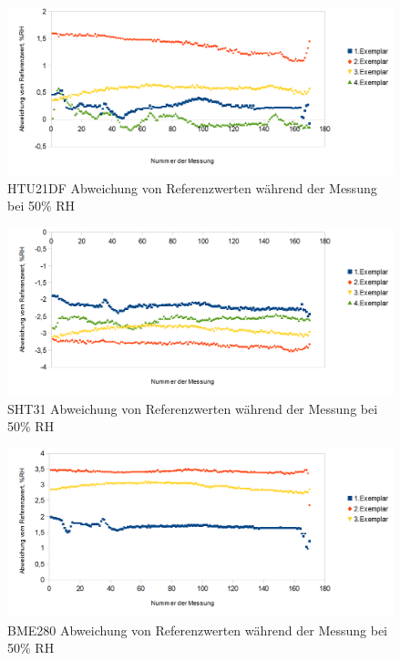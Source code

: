 \documentclass[runningheads]{llncs}
\begin{document}
\begin{figure}[h]
\includegraphics[width=\textwidth]{pictures/HTU21D_50.png}
\caption{HTU21DF Abweichung von Referenzwerten während der Messung bei 50\% RH}
\end{figure}

\begin{figure}[h]
\includegraphics[width=\textwidth]{pictures/SHT31_50.png}
\caption{SHT31 Abweichung von Referenzwerten während der Messung bei 50\% RH}
\end{figure}


\begin{figure}[h]
\includegraphics[width=\textwidth]{pictures/BME280_50.png}
\caption{BME280 Abweichung von Referenzwerten während der Messung bei 50\% RH}
\end{figure}
\end{document}
